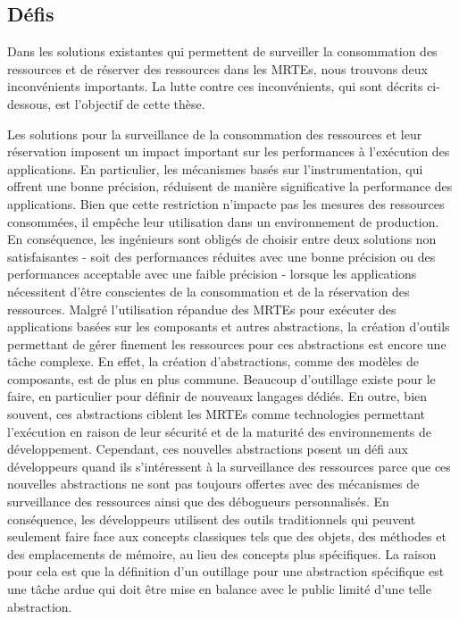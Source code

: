 \subsection*{Défis}

Dans les solutions existantes qui permettent de surveiller la consommation des ressources et de réserver des ressources dans les MRTEs, nous trouvons deux inconvénients importants. La lutte contre ces inconvénients, qui sont décrits ci-dessous, est l'objectif de cette thèse.

Les solutions pour la surveillance de la consommation des ressources et leur réservation imposent un impact important sur les performances à l'exécution des applications. En particulier, les mécanismes basés sur l'instrumentation, qui offrent une bonne précision, réduisent de manière significative la performance des applications. Bien que cette restriction n’impacte pas les mesures des ressources consommées, il empêche leur utilisation dans un environnement de production. En conséquence, les ingénieurs sont obligés de choisir entre deux solutions non satisfaisantes - soit des performances réduites avec une bonne précision ou des performances acceptable avec une faible précision - lorsque les applications nécessitent d’être  conscientes de la consommation et de la réservation des ressources.
Malgré l'utilisation répandue des MRTEs pour exécuter des applications basées sur les composants et autres abstractions, la création d'outils permettant de gérer finement les ressources pour ces abstractions est encore une tâche complexe. En effet, la création d'abstractions, comme des modèles de composants, est de plus en plus commune. Beaucoup d'outillage existe pour le faire, en particulier pour définir de nouveaux langages dédiés. En outre, bien souvent, ces abstractions ciblent les MRTEs comme technologies permettant l’exécution en raison de leur sécurité et de la maturité des environnements de développement. Cependant, ces nouvelles abstractions posent un défi aux développeurs quand ils s’intéressent à la surveillance des ressources parce que ces nouvelles abstractions ne sont pas toujours offertes avec des mécanismes de surveillance des ressources ainsi que des débogueurs personnalisés. En conséquence, les développeurs utilisent des outils traditionnels qui peuvent seulement faire face aux concepts classiques tels que des objets, des méthodes et des emplacements de mémoire, au lieu des concepts plus spécifiques. La raison pour cela est que la définition d’un outillage pour une abstraction spécifique est une tâche ardue qui doit être mise en balance avec le public limité d'une telle abstraction.

